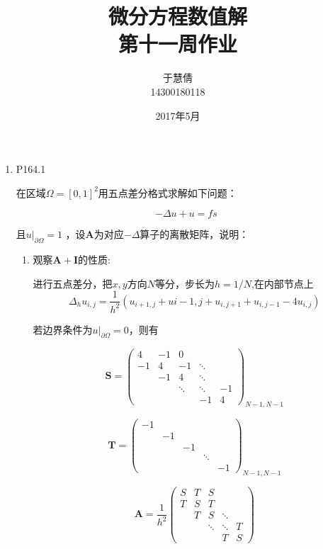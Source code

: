 \documentclass{ctexart}
\title{微分方程数值解 \\ 第十一周作业}
\author{于慧倩 \\ 14300180118}
\date{2017年5月}
\begin{document}
\maketitle

\newpage

\begin{enumerate}

\item P164.1

 在区域\(\Omega = [0,1]^2\)用五点差分格式求解如下问题：
 
\[
-\Delta u +u =fs
\]

且\(u|_{\partial \Omega} = 1\) ，设\(\bm{A}\)为对应\(-\Delta\)算子的离散矩阵，说明：
\begin{enumerate}
\item 观察\(\bm{A}+\bm{I}\)的性质:


进行五点差分，把\(x,y\)方向\(N\)等分，步长为\(h=1/N\),在内部节点上
\[
\Delta_h u_{i,j} = \frac{1}{h^2}(u_{i+1,j}+u{i-1,j}+u_{i,j+1}+u_{i,j-1}-4u_{i,j})
\]

若边界条件为\(u|_{\partial \Omega} =0\)，则有

\begin{equation*}
\bm{S}={
\left ( \begin{array}{ccccc}
4 & -1 &0  & &  \\
-1& 4 & -1 & \ddots& \\
  &-1& 4&\ddots & \\
  & &\ddots &\ddots &-1\\
  &  & &-1 &4
\end{array} 
\right )_{N-1,N-1}}
\end{equation*}
 
 \begin{equation*}
\bm{T}={
\left ( \begin{array}{ccccc}
 -1&  & & &  \\
 & -1 & & & \\
  & & -1&& \\
  & & &\ddots &\\
  &  & & &-1
\end{array} 
\right )_{N-1,N-1}}
\end{equation*}

 \begin{equation*}
\bm{A}=\frac{1}{h^2}{
\left ( \begin{array}{ccccc}
S&T  &S & &  \\
T & S & T& & \\
  & T& S&\ddots & \\
  & &\ddots  &\ddots &T\\
  &  & &T &S
\end{array} 
\right )}
\end{equation*}



\end{enumerate}
\end{enumerate}
\end{document}
